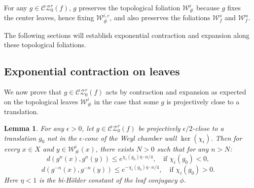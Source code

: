 \documentclass[11pt]{amsart}
\numberwithin{equation}{section}
\newcommand{\W}{\mathcal{W}}
\newcommand{\CZ}{\mathcal{CZ}}
\theoremstyle{plain}
\newtheorem{lem}[thm]{Lemma}
\begin{document}
For any $g\in \CZ^r_0(f)$, $g$ preserves the topological foliation $\W^i_\#$ because $g$ fixes the center leaves, hence fixing $\W^{i,c}_\#$, and also preserves the foliations $\W^s_f$ and $\W^u_f$.

The following sections will establish exponential contraction and expansion along these topological foliations.


\subsection{Exponential contraction on leaves}

We now prove that $g\in\CZ^r_0(f)$ acts by contraction and expansion as expected on the topological leaves $\W^i_\#$ in the case that some $g$ is projectively close to a translation.

\begin{lem}\label{gcontr} 
For any $\epsilon>0$, let $g\in \CZ^r_0(f)$ be projectively $\epsilon/2$-close to a translation $g_0$ not in the $\epsilon$-cone of the Weyl chamber wall $\ker(\chi_i)$. Then for every $x\in X$ and $y\in \W^i_\#(x)$, there exists $N>0$ such that for any $n>N$:
\[
d(g^n(x),g^n(y)) \le e^{\chi_i(g_0) \eta \cdot n/4}, \quad \text{if } \chi_i(g_0)<0,
\] 
\[
d(g^{-n}(x),g^{-n}(y)) \le e^{-\chi_i(g_0) \eta \cdot n/4}, \quad \text{if } \chi_i(g_0)>0.
\] 
Here $\eta<1$ is the bi-H\"older constant of the leaf conjugacy $\phi$.
\end{lem}
\end{document}
